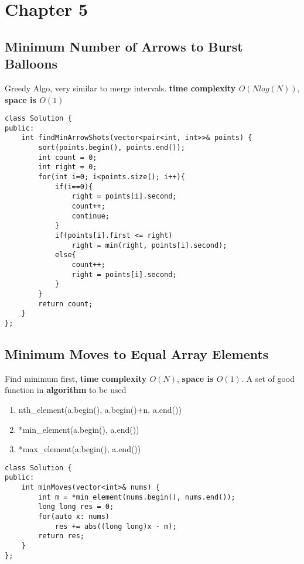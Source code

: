 \section{Chapter 5}

\subsection{Minimum Number of Arrows to Burst Balloons}
Greedy Algo, very similar to merge intervals. {\color{blue}\textbf{time complexity $O(Nlog(N))$}}, {\color{blue}\textbf{space is $O(1)$}}

\begin{lstlisting}
class Solution {
public:
    int findMinArrowShots(vector<pair<int, int>>& points) {
        sort(points.begin(), points.end());
        int count = 0;
        int right = 0;
        for(int i=0; i<points.size(); i++){
            if(i==0){
                right = points[i].second;
                count++;
                continue;
            }
            if(points[i].first <= right)
                right = min(right, points[i].second);
            else{
                count++;
                right = points[i].second;
            }
        }
        return count;
    }
};
\end{lstlisting}



\subsection{Minimum Moves to Equal Array Elements}

Find minimum first, {\color{blue}\textbf{time complexity $O(N)$}}, {\color{blue}\textbf{space is $O(1)$}}. A set of good function in \textbf{algorithm} to be used

\begin{enumerate}
  \item nth\_element(a.begin(), a.begin()+n, a.end())
  \item *min\_element(a.begin(), a.end())
  \item *max\_element(a.begin(), a.end())
\end{enumerate}



\begin{lstlisting}
class Solution {
public:
    int minMoves(vector<int>& nums) {
        int m = *min_element(nums.begin(), nums.end());
        long long res = 0;
        for(auto x: nums)
            res += abs((long long)x - m);
        return res;
    }
};
\end{lstlisting}



